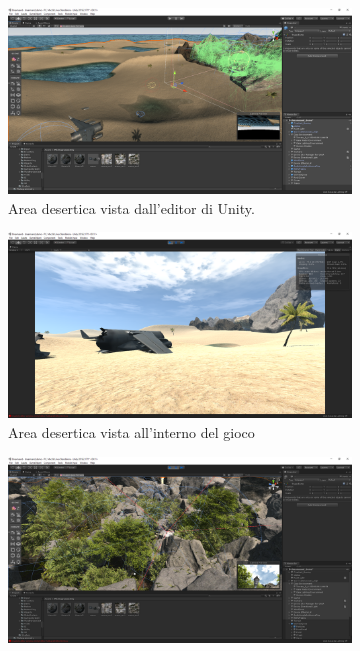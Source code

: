 \documentclass[12pt]{report}
\begin{document}
\begin{figure}[H]
  \centering
  \begin{subfigure}[b]{0.45\linewidth}
    \centering
    \includegraphics[width=\linewidth]{img/dreamsand-scene.png}
    \captionsetup{justification=centering}
    \caption{Area desertica vista dall'editor di Unity.}
  \end{subfigure}
   \begin{subfigure}[b]{0.45\linewidth}
    \centering
    \includegraphics[width=\linewidth]{img/dreamsand-ingame.png}
    \captionsetup{justification=centering}
    \caption{Area desertica vista all'interno del gioco}
  \end{subfigure}
  \begin{subfigure}[b]{0.45\linewidth}
    \centering
    \includegraphics[width=\linewidth]{img/dreamsand-oasis-scene.png} %

\end{subfigure}
\end{figure}
\end{document}
